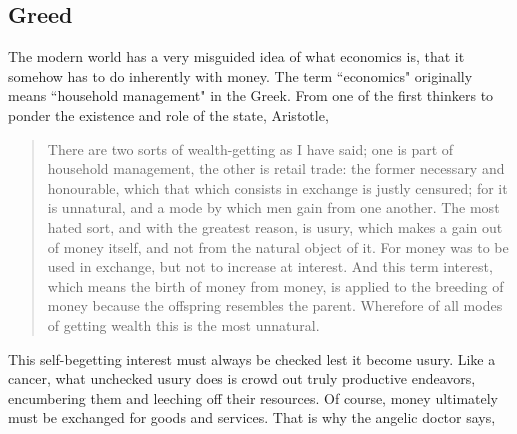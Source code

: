\documentclass[letterpaper]{article}
\begin{document}



\subsection{Greed}

The modern world has a very misguided idea of what economics is, that it somehow has to do inherently with money. The term ``economics" originally means ``household management" in the Greek. From one of the first thinkers to ponder the existence and role of the state, Aristotle,

\begin{quote}
  There are two sorts of wealth-getting as I have said; one is part of household management, the other is retail trade: the former necessary and honourable, which that which consists in exchange is justly censured; for it is unnatural, and a mode by which men gain from one another. The most hated sort, and with the greatest reason, is usury, which makes a gain out of money itself, and not from the natural object of it. For money was to be used in exchange, but not to increase at interest. And this term interest, which means the birth of money from money, is applied to the breeding of money because the offspring resembles the parent. Wherefore of all modes of getting wealth this is the most unnatural.
\end{quote}

This self-begetting interest must always be checked lest it become usury. Like a cancer, what unchecked usury does is crowd out truly productive endeavors, encumbering them and leeching off their resources. Of course, money ultimately must be exchanged for goods and services. That is why the angelic doctor says,
\end{document}

